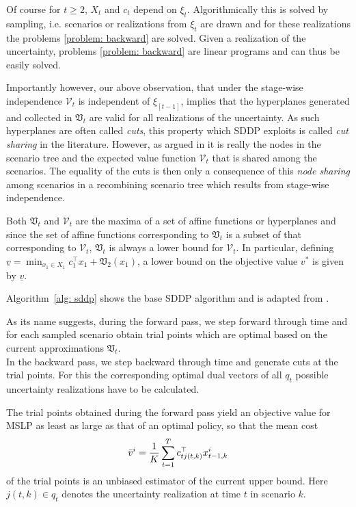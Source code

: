 \documentclass[a4paper,12pt]{article}
\begin{document}
Of course for $t\geq 2$, $X_t$ and $c_t$ depend on $\xi_t$. Algorithmically this is solved by sampling, i.e. scenarios or realizations from $\xi_t$ are drawn and for these realizations the problems \eqref{problem: backward} are solved.
Given a realization of the uncertainty, problems \eqref{problem: backward} are linear programs and can thus be easily solved.

Importantly however, our above observation, that under the stage-wise independence $\mathcal{V}_t$ is independent of $\xi_{[t-1]}$, implies that the hyperplanes generated and collected in $\mathfrak{V}_t$ are valid for all realizations of the uncertainty. As such hyperplanes are often called \emph{cuts}, this property which SDDP exploits is called \emph{cut sharing} in the literature. However, as argued in \cite{fuellner2021stochastic} it is really the nodes in the scenario tree and the expected value function $\mathcal{V}_t$ that is shared among the scenarios. The equality of the cuts is then only a consequence of this \emph{node sharing} among scenarios in a recombining scenario tree which results from stage-wise independence.

Both $\mathfrak{V}_t$ and $\mathcal{V}_t$ are the maxima of a set of affine functions or hyperplanes and since the set of affine functions corresponding to $\mathfrak{V}_t$ is a subset of that corresponding to $\mathcal{V}_t$, $\mathfrak{V}_t$ is always a lower bound for $\mathcal{V}_t$. In particular, defining
$\underline{v} = \min_{x_1 \in X_1} c_1^\top x_1 + \mathfrak{V}_{2}(x_1)$, a lower bound on the objective value $v^*$ is given by $\underline{v}$.

Algorithm~\ref{alg: sddp} shows the base SDDP algorithm and is adapted from \cite{fuellner2021stochastic}.

As its name suggests, during the forward pass, we step forward through time and for each sampled scenario obtain trial points which are optimal based on the current approximations $\mathfrak{V}_t$. \\
In the backward pass, we step backward through time and generate cuts at the trial points. For this the corresponding optimal dual vectors of all $q_t$ possible uncertainty realizations have to be calculated.

The trial points obtained during the forward pass yield an objective value for MSLP as least as large as that of an optimal policy, so that the mean cost \begin{equation}
\Bar{v}^i = \frac{1}{K}\sum_{t=1}^T c_{tj(t,k)}^\top x^i_{t-1,k}    
\end{equation}
of the trial points is an unbiased estimator of the current upper bound. Here $j(t,k) \in q_t$ denotes the uncertainty realization at time $t$ in scenario $k$.
\end{document}
